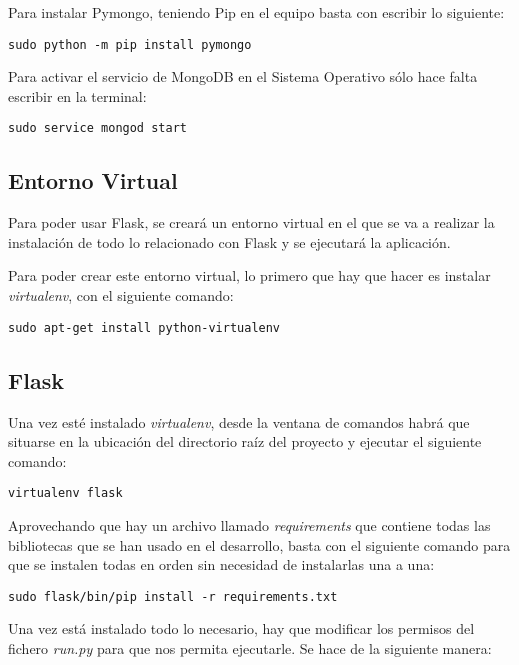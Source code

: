 Para instalar Pymongo, teniendo Pip en el equipo basta con escribir lo siguiente:

\begin{verbatim}
sudo python -m pip install pymongo
\end{verbatim}


Para activar el servicio de MongoDB en el Sistema Operativo sólo hace falta escribir en la terminal:

\begin{verbatim}
sudo service mongod start
\end{verbatim}

\subsection{Entorno Virtual}

Para poder usar Flask, se creará un entorno virtual en el que se va a realizar la instalación de todo lo relacionado con Flask y se ejecutará la aplicación.

Para poder crear este entorno virtual, lo primero que hay que hacer es instalar \emph{virtualenv}, con el siguiente comando:

\begin{verbatim}
sudo apt-get install python-virtualenv
\end{verbatim}

\subsection{Flask}

Una vez esté instalado \emph{virtualenv}, desde la ventana de comandos habrá que situarse en la ubicación del directorio raíz del proyecto y ejecutar el siguiente comando:

\begin{verbatim}
virtualenv flask
\end{verbatim}


Aprovechando que hay un archivo llamado \emph{requirements} que contiene todas las bibliotecas que se han usado en el desarrollo, basta con el siguiente comando para que se instalen todas en orden sin necesidad de instalarlas una a una:

\begin{verbatim}
sudo flask/bin/pip install -r requirements.txt
\end{verbatim}


Una vez está instalado todo lo necesario, hay que modificar los permisos del fichero \emph{run.py} para que nos permita ejecutarle. Se hace de la siguiente manera:

